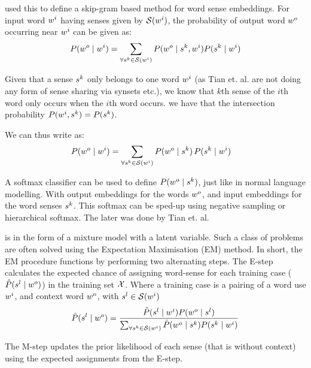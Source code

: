 \documentclass[12pt,parskip]{komatufte}
\begin{document}
 used this to define a  skip-gram based method for word sense embeddings.
For input word $\n w_i$ having senses given by $\seq S(\n w_i)$,
the probability of output word $\n w_o$ occurring near $\n w_i$ can be given as:
\begin{equation}
	P(\n w_o\mid \n w_i) = \sum_{\forall \n s_k \in \seq S(\n w_i)} P(\n w_o \mid \n s_k, \n w_i) P(\n s_k \mid \n w_i) \label{equ:tianmm}
\end{equation}

Given that a sense $\n s_k$ only belongs to one word $\n w_i$ (as Tian et. al. are not doing any form of sense sharing via synsets etc.),
we know that $k$th sense of the $i$th word only occurs when the $i$th word occurs.
we have that the intersection probability $P(\n w_i,\n s_k) = P(\n s_k)$.

We can thus write  as:
\begin{align}
P(\n w_o\mid \n w_i) &= \sum_{\forall \n s_k \in \seq S(\n w_i)} P(\n w_o \mid \n s_k) \, P(\n s_k \mid \n w_i) \label{equ:tianmm2}
\end{align}

A softmax classifier can be used to define $P(\n w_o \mid \n s_k)$, just like in normal language modelling.
With output embeddings for the words $\n w_o$, and input embeddings for the word senses $\n s_k$.
This softmax can be sped-up using negative sampling or hierarchical softmax.
The later was done by Tian et. al.

 is in the form of a mixture model with a latent variable.
Such a class of problems are often solved using the Expectation Maximisation (EM) method.
In short, the EM procedure functions by performing two alternating steps.
The E-step calculates the expected chance of assigning word-sense for each training case ($\hat{P}(\n s_l \mid \n w_o)$) in the training set $\mathcal{X}$.
Where a training case is a pairing of a word use $\n w_i$, and context word $\n w_o$, with $\n s_l\in \seq S(\n w_i)$
\begin{align}
\hat{P}(\n s_l \mid \n w_o) = \frac{\hat{P}(\n s_l \mid \n w_i) P(\n w_o \mid \n s_l)}{\sum_{\forall \n s_k \in \seq S(\n w_i)} \hat{P}(\n w_o \mid \n s_k) P(\n s_k \mid \n w_i)}
\end{align}

The M-step updates the prior likelihood of each sense (that is without context) using the expected assignments from the E-step.
\end{document}
